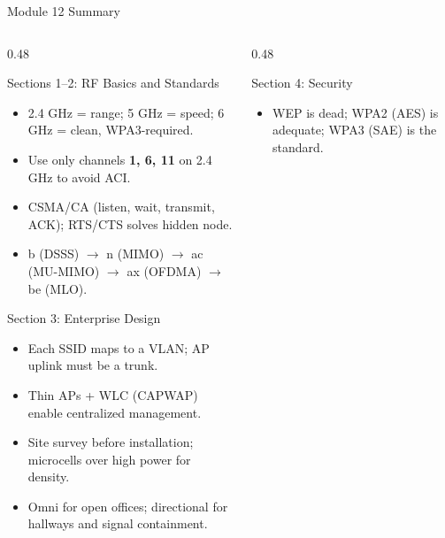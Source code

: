 \documentclass[aspectratio=169]{beamer}
\begin{document}
\begin{frame}[shrink=5]{Module 12 Summary}
    \begin{columns}[T]
        \begin{column}{0.48\textwidth}
            \begin{block}{Sections 1--2: RF Basics and Standards}
                \scriptsize
                \begin{itemize}
                    \item 2.4 GHz = range; 5 GHz = speed; 6 GHz = clean, WPA3-required.
                    \item Use only channels \textbf{1, 6, 11} on 2.4 GHz to avoid ACI.
                    \item CSMA/CA (listen, wait, transmit, ACK); RTS/CTS solves hidden node.
                    \item b (DSSS) $\to$ n (MIMO) $\to$ ac (MU-MIMO) $\to$ ax (OFDMA) $\to$ be (MLO).
                \end{itemize}
            \end{block}
            \vspace{0.3em}
            \begin{block}{Section 3: Enterprise Design}
                \scriptsize
                \begin{itemize}
                    \item Each SSID maps to a VLAN; AP uplink must be a trunk.
                    \item Thin APs + WLC (CAPWAP) enable centralized management.
                    \item Site survey before installation; microcells over high power for density.
                    \item Omni for open offices; directional for hallways and signal containment.
                \end{itemize}
            \end{block}
        \end{column}
        \begin{column}{0.48\textwidth}
            \begin{block}{Section 4: Security}
                \scriptsize
                \begin{itemize}
                    \item WEP is dead; WPA2 (AES) is adequate; WPA3 (SAE) is the standard.

\end{itemize}
\end{block}
\end{column}
\end{columns}
\end{frame}
\end{document}
